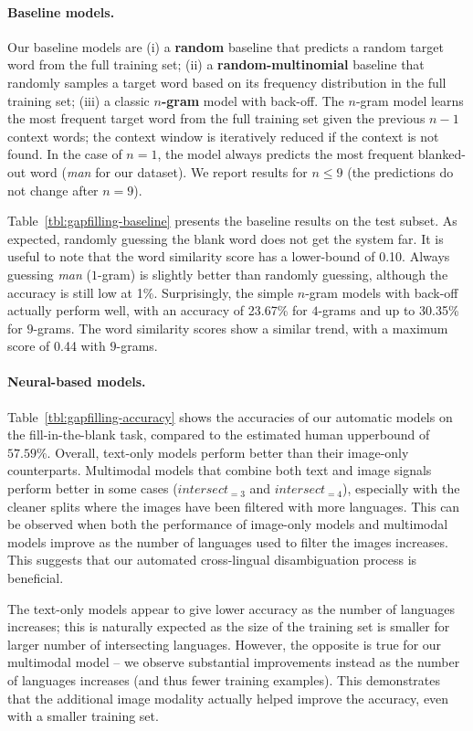 \documentclass[twocolumn]{svjour3}          \smartqed  \usepackage{graphicx}
\begin{document}
\paragraph{Baseline models. } Our baseline models are (i) a \textbf{random} baseline that predicts a random target word from the full training set; (ii) a \textbf{random-multinomial} baseline that randomly samples a target word based on its frequency distribution in the full training set; (iii) a classic \textbf{$n$-gram} model with back-off. The $n$-gram model learns the most frequent target word from the full training set given the previous $n-1$ context words; the context window is iteratively reduced if the context is not found. In the case of $n=1$, the model always predicts the most frequent blanked-out word (\textit{man} for our dataset). We report results for $n\le9$ (the predictions do not change after $n=9$). 

Table~\ref{tbl:gapfilling-baseline} presents the baseline results on the test subset. As expected, randomly guessing the blank word does not get the system far. It is useful to note that the word similarity score has a lower-bound of 0.10. Always guessing \textit{man} ($1$-gram) is slightly better than randomly guessing, although the accuracy is still low at 1\%. Surprisingly, the simple $n$-gram models with back-off actually perform well, with an accuracy of 23.67\% for $4$-grams and up to 30.35\% for $9$-grams. The word similarity scores show a similar trend, with a maximum score of 0.44 with $9$-grams.


\paragraph{Neural-based models. }
Table~\ref{tbl:gapfilling-accuracy} shows the accuracies of our automatic models on the fill-in-the-blank task, compared to the estimated human upperbound of $57.59\%$. Overall, text-only models perform better than their image-only counterparts. Multimodal models that combine both text and image signals perform better in some cases ($intersect_{=3}$ and $intersect_{=4}$), especially with the cleaner splits where the images have been filtered with more languages. This can be observed when both the performance of image-only models and multimodal models improve as the number of languages used to filter the images increases. This suggests that our automated cross-lingual disambiguation process is beneficial.

The text-only models appear to give lower accuracy as the number of languages increases; this is naturally expected as the size of the training set is smaller for larger number of intersecting languages. However, the opposite is true for our multimodal model -- we observe substantial improvements instead as the number of languages increases (and thus fewer training examples). This demonstrates that the additional image modality actually helped improve the accuracy, even with a smaller training set.
\end{document}
